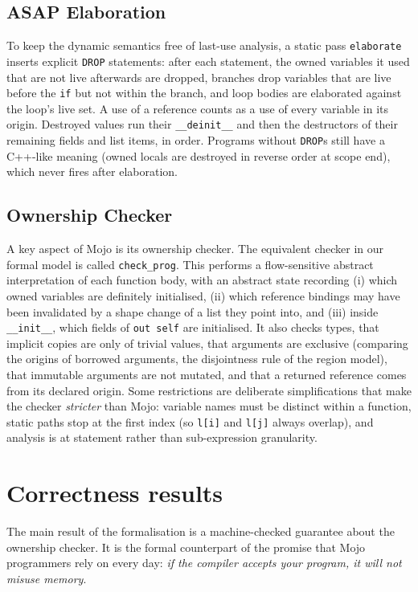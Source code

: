 \documentclass[11pt,a4paper]{article}
\newcommand{\code}[1]{\texttt{#1}}
\begin{document}
\subsection{ASAP Elaboration}\label{sec:sound-intro}
To keep the dynamic semantics free of last-use analysis, a static pass
\code{elaborate} inserts explicit \code{DROP} statements: after each statement,
the owned variables it used that are not live afterwards are dropped, branches
drop variables that are live before the \code{if} but not within the branch, and
loop bodies are elaborated against the loop's live set. A use of a reference
counts as a use of every variable in its origin. Destroyed values run their
\code{\_\_deinit\_\_} and then the destructors of their remaining fields and list
items, in order. Programs without \code{DROP}s still have a C++-like meaning
(owned locals are destroyed in reverse order at scope end), which never fires
after elaboration.

\subsection{Ownership Checker}
A key aspect of Mojo is its ownership checker.
The equivalent checker in our formal model is called \code{check\_prog}.
This performs a flow-sensitive abstract interpretation of each function
body, with an abstract state recording (i) which owned variables are definitely
initialised, (ii) which reference bindings may have been invalidated by a
shape change of a list they point into, and (iii) inside \code{\_\_init\_\_}, which
fields of \code{out self} are initialised. It also checks types, that implicit
copies are only of trivial values, that arguments are exclusive (comparing the
origins of borrowed arguments, the disjointness rule of the region model),
that immutable arguments are not mutated, and that a returned reference comes
from its declared origin. Some restrictions are deliberate simplifications
that make the checker \emph{stricter} than Mojo: variable names must be
distinct within a function, static paths stop at the first index (so
\code{l[i]} and \code{l[j]} always overlap), and analysis is at statement rather
than sub-expression granularity.

\section{Correctness results}\label{sec:sound}

The main result of the formalisation is a machine-checked guarantee about the
ownership checker. It is the formal counterpart of the promise that Mojo
programmers rely on every day: \emph{if the compiler accepts your program, it
will not misuse memory}.
\end{document}
